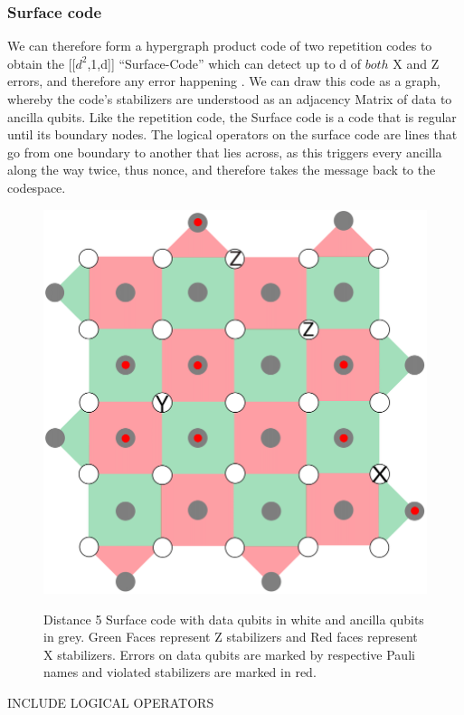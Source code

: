 \subsubsection{Surface code}
We can therefore form a hypergraph product code of two repetition
codes to
obtain the [[$d^2$,1,d]] ``Surface-Code'' which can detect up
to d of $both$ X and Z errors, and 
therefore any error happening \cite{joschka}.
We can draw this code as a graph, whereby the code's stabilizers
are understood as an adjacency Matrix of data to ancilla qubits.
Like the repetition code, the Surface code is a code that is regular until
its boundary nodes. 
The logical operators on the surface code are lines that go from one 
boundary to another that lies across, as this triggers every ancilla along
the way twice, thus nonce, and therefore takes the message back to the
codespace.

\begin{figure}[h!]
	\begin{center}
	\captionsetup{justification=centering,margin=2cm}
	\includegraphics[scale=0.35]{./img/figures/d5surfaceCode.png}\\
	\caption{Distance 5 Surface code with data qubits in white and 
    ancilla qubits in grey. Green Faces represent Z stabilizers
    and Red faces represent X stabilizers.
    Errors on data qubits are marked
    by respective Pauli names and violated stabilizers are marked in red.}
	\label{fig: surface_code}
	\end{center}
\end{figure}


INCLUDE LOGICAL OPERATORS
\newpage